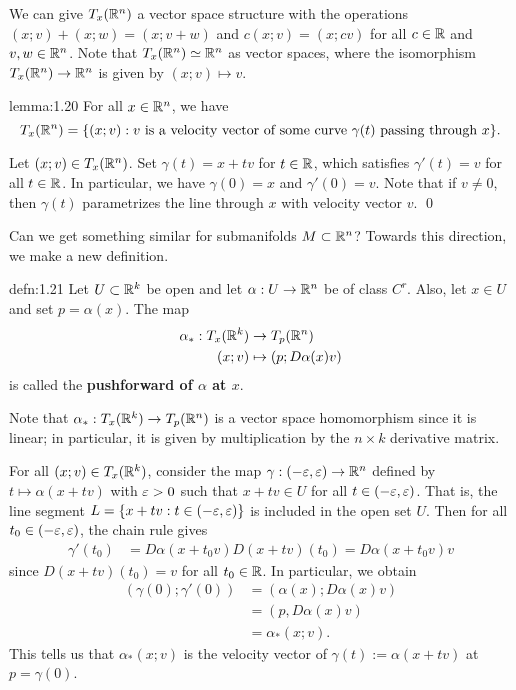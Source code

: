 We can give $T_x(\mathbb{R}^n)$ a vector space structure with the operations 
$(x; v) + (x; w) = (x; v+w)$ and $c(x; v) = (x; cv)$ for all 
$c \in \mathbb{R}$ and $v, w \in \mathbb{R}^n$. Note that $T_x(\mathbb{R}^n) \simeq \mathbb{R}^n$ as vector 
spaces, where the isomorphism $T_x(\mathbb{R}^n) \to \mathbb{R}^n$ is given by $(x; v) \mapsto v$. 

\begin{lemma}{lemma:1.20}
    For all $x \in \mathbb{R}^n$, we have 
    \[ T_x(\mathbb{R}^n) = \{(x; v) : v \text{ is a velocity vector of some 
    curve $\gamma(t)$ passing through $x$}\}. \] 
\end{lemma}\vspace{-0.25cm}
\begin{pf}
    Let $(x; v) \in T_x(\mathbb{R}^n)$. Set $\gamma(t) = x + tv$ for $t \in \mathbb{R}$, 
    which satisfies $\gamma'(t) = v$ for all $t \in \mathbb{R}$. In particular, we 
    have $\gamma(0) = x$ and $\gamma'(0) = v$. Note that if $v \neq 0$, then 
    $\gamma(t)$ parametrizes the line through $x$ with velocity vector $v$. \qed 
\end{pf}\vspace{-0.25cm}

Can we get something similar for submanifolds $M \subset \mathbb{R}^n$? 
Towards this direction, we make a new definition. 

\begin{defn}{defn:1.21}
    Let $U \subset \mathbb{R}^k$ be open and let $\alpha : U \to \mathbb{R}^n$ be of class $C^r$. 
    Also, let $x \in U$ and set $p = \alpha(x)$. The map 
    \begin{align*}
        \alpha_* : T_x(\mathbb{R}^k) &\to T_p(\mathbb{R}^n) \\ 
        (x; v) &\mapsto (p; D\alpha(x) v)
    \end{align*}
    is called the {\bf pushforward of $\alpha$ at $x$}. 
\end{defn}\vspace{-0.25cm}

Note that $\alpha_* : T_x(\mathbb{R}^k) \to T_p(\mathbb{R}^n)$ is a vector space homomorphism since it is linear; 
in particular, it is given by multiplication by the $n\times k$ derivative matrix. 

For all $(x; v) \in T_x(\mathbb{R}^k)$, consider the map $\gamma : (-\varepsilon, \varepsilon) \to \mathbb{R}^n$
defined by $t \mapsto \alpha(x+tv)$
with $\varepsilon > 0$ such that $x + tv \in U$ for all $t \in (-\varepsilon, \varepsilon)$. 
That is, the line segment $L = \{x + tv : t \in (-\varepsilon, \varepsilon)\}$
is included in the open set $U$. Then for all $t_0 \in (-\varepsilon, \varepsilon)$, 
the chain rule gives 
\begin{align*}
    \gamma'(t_0) &= D\alpha(x + t_0 v) D(x + tv)(t_0) 
    = D\alpha(x + t_0 v) v 
\end{align*}
since $D(x + tv)(t_0) = v$ for all $t_0 \in \mathbb{R}$. In particular, we obtain 
\begin{align*}
    (\gamma(0); \gamma'(0)) &= (\alpha(x); D\alpha(x)v) \\ 
    &= (p, D\alpha(x)v) \\ 
    &= \alpha_*(x; v). 
\end{align*}
This tells us that $\alpha_*(x; v)$ is the velocity vector of 
$\gamma(t) := \alpha(x + tv)$ at $p = \gamma(0)$.

